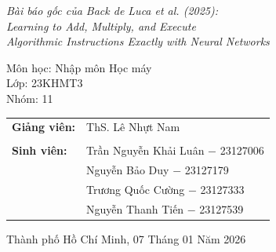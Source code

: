 \begin{titlepage}
\begin{center}
        {\fontsize{12pt}{14pt}\selectfont
        \parbox{0.88\textwidth}{\centering\itshape
            Bài báo gốc của Back de Luca et al. (2025):\\
            Learning to Add, Multiply, and Execute\\
            Algorithmic Instructions Exactly with Neural Networks
        }}

        \vspace{0.8cm}
        {\fontsize{13pt}{0pt}\selectfont Môn học: Nhập môn Học máy}\\\vspace{0.2cm}
                {\fontsize{13pt}{0pt}\selectfont Lớp: 23KHMT3}\vspace{0.2cm} \\
        {\fontsize{13pt}{0pt}\selectfont Nhóm: 11}\vspace{0.2cm} 

        \vspace{1cm}

        \begin{tabular}{l l}
            \fontsize{13pt}{0pt}\selectfont \textbf{Giảng viên:} & \fontsize{13pt}{0pt}\selectfont ThS. Lê Nhựt Nam \\
            \\[-2pt]
            \vspace{0.2cm}
            \fontsize{13pt}{0pt}\selectfont \textbf{Sinh viên:} & \fontsize{13pt}{0pt}\selectfont Trần Nguyễn Khải Luân $-$ 23127006 \\
            & \vspace{0.2cm}\fontsize{13pt}{0pt}\selectfont Nguyễn Bảo Duy $-$ 23127179 \\
            & \vspace{0.2cm}\fontsize{13pt}{0pt}\selectfont Trương Quốc Cường $-$ 23127333 \\
            & \vspace{0.2cm}\fontsize{13pt}{0pt}\selectfont Nguyễn Thanh Tiến $-$ 23127539 \\
        \end{tabular}

        \vfill
\fontsize{13pt}{0pt}\selectfont Thành phố Hồ Chí Minh, 07 Tháng 01 Năm 2026    \end{center}
\vspace{0.2cm}
\end{titlepage}
